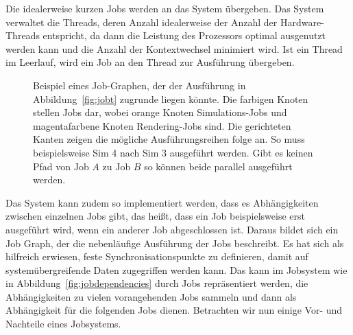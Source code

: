 Die idealerweise kurzen Jobs werden an das System übergeben. Das System verwaltet die Threads, deren Anzahl idealerweise der Anzahl der Hardware-Threads entspricht, da dann die Leistung des Prozessors optimal ausgenutzt werden kann und die Anzahl der Kontextwechsel minimiert wird. Ist ein Thread im Leerlauf, wird ein Job an den Thread zur Ausführung übergeben.

\begin{figure}
	\centering
	\caption[Beispiel eines Job-Graphen in einem Jobsystem.]{Beispiel eines Job-Graphen, der der Ausführung in Abbildung~\vref{fig:jobt} zugrunde liegen könnte. Die farbigen Knoten stellen Jobs dar, wobei orange Knoten Simulations-Jobs und magentafarbene Knoten Rendering-Jobs sind. Die gerichteten Kanten zeigen die mögliche Ausführungsreihen folge an. So muss beispielsweise Sim 4 nach Sim 3 ausgeführt werden. Gibt es keinen Pfad von Job $A$ zu Job $B$ so können beide parallel ausgeführt werden.}\label{fig:jobdependencies}
\end{figure}
Das System kann zudem so implementiert werden, dass es Abhängigkeiten zwischen einzelnen Jobs gibt, das heißt, dass ein Job beispielsweise erst ausgeführt wird, wenn ein anderer Job abgeschlossen ist. Daraus bildet sich ein Job Graph, der die nebenläufige Ausführung der Jobs beschreibt. Es hat sich als hilfreich erwiesen, feste Synchronisationspunkte zu definieren, damit auf systemübergreifende Daten zugegriffen werden kann. Das kann im Jobsystem wie in Abbildung~\vref{fig:jobdependencies} durch Jobs repräsentiert werden, die Abhängigkeiten zu vielen vorangehenden Jobs sammeln und dann als Abhängigkeit für die folgenden Jobs dienen. Betrachten wir nun einige Vor- und Nachteile eines Jobsystems.
